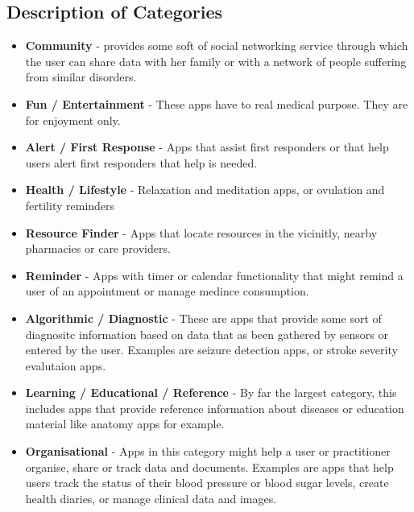 \subsection{Description of Categories}
\noindent
\begin{itemize}
\item \textbf{Community} - provides some soft of social networking service through which the user can share data with her family or with a network of people suffering from similar disorders.
\item \textbf{Fun / Entertainment} - These apps have to real medical purpose. They are for enjoyment only.
\item \textbf{Alert / First Response} - Apps that assist first responders or that help users alert first responders that help is needed.
\item \textbf{Health / Lifestyle} - Relaxation and meditation apps, or ovulation and fertility reminders
\item \textbf{Resource Finder} - Apps that locate resources in the vicinitly, nearby pharmacies or care providers.
\item \textbf{Reminder} - Apps with timer or calendar functionality that might remind a user of an appointment or manage medince consumption.
\item \textbf{Algorithmic / Diagnostic} - These are apps that provide some sort of diagnositc information based on data that as been gathered by sensors or entered by the user. Examples are seizure detection apps, or stroke severity evalutaion apps.
\item \textbf{Learning / Educational / Reference} - By far the largest category, this includes apps that provide reference information about diseases or education material like anatomy apps for example.
\item \textbf{Organisational} - Apps in this category might help a user or practitioner organise, share or track data and documents. Examples are apps that help users track the status of their blood pressure or blood sugar levels, create health diaries, or manage clinical data and images.
\end{itemize}
